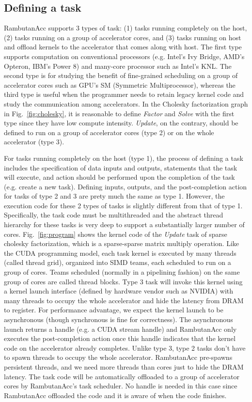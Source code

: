 \subsection{Defining a task}
RambutanAcc supports 3 types of task: (1) tasks running completely on the host, (2) tasks running on a group of accelerator cores, and (3) tasks running on host and offload kernels to the accelerator that comes along with host.
The first type supports computation on conventional processors (e.g. Intel's Ivy Bridge, AMD's Opteron, IBM's Power 8)  and many-core processor such as Intel's KNL.
The second type is for studying the benefit of fine-grained scheduling on a group of accelerator cores such as GPU's SM (Symmetric Multiprocessor), whereas the third type is useful when the programmer needs to retain legacy kernel code and study the communication among accelerators.
In the Cholesky factorization graph in Fig.~\ref{fig:cholesky}, it is reasonable to define {\em Factor} and {\em Solve} with the first type since they have low compute intensity. 
{\em Update}, on the contrary, should be defined to run on a group of accelerator cores (type 2) or on the whole accelerator (type 3).

For tasks running completely on the host (type 1), the process of defining a task includes the specification of data inputs and outputs, statements that the task will execute, and action should be performed upon the completion of the task (e.g. create a new task).
Defining inputs, outputs, and the post-completion action for tasks of type 2 and 3 are prety much the same as type 1.
However, the execution code for these 2 types of tasks is slightly different from that of type 1.
Specifically, the task code must be multithreaded and the abstract thread hierarchy for these tasks is very deep to support a substantially larger number of cores.
Fig.~\ref{fig:program} shows the kernel code of the {\em Update} task of sparse cholesky factorization, which is a sparse-sparse matrix multiply operation.
Like the CUDA programming model, each task kernel is executed by many threads (called thread grid), organized into SIMD teams, each scheduled to run on a group of cores.
Teams scheduled (normally in a pipelining fashion) on the same group of cores are called thread blocks.
Type 3 task will invoke this kernel using a kernel launch interface (defined by hardware vendor such as NVIDIA) with many threads to occupy the whole accelerator and hide the latency from DRAM to register.
For performance advantage, we expect the kernel launch to be asynchronous (though synchronous is fine for correctness).
The asynchronous launch returns a handle (e.g. a CUDA stream handle) and RambutanAcc only executes the post-completion action once this handle indicates that the kernel code on the accelerator already completes.
Unlike type 3, type 2 tasks don't have to spawn threads to occupy the whole accelerator.
RambutanAcc pre-spawns persistent threads, and we need more threads than cores just to hide the DRAM latency.
The task code will be automatically offloaded to a group of accelerator cores by RambutanAcc's task scheduler.
No handle is needed in this case since RambutanAcc offloaded the code and it is aware of when the code finishes.


